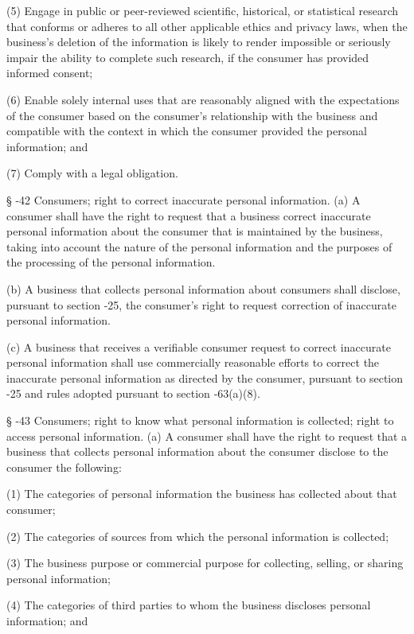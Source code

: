      (5)  Engage in public or peer-reviewed scientific, historical, or statistical research that conforms or adheres to all other applicable ethics and privacy laws, when the business's deletion of the information is likely to render impossible or seriously impair the ability to complete such research, if the consumer has provided informed consent;

     (6)  Enable solely internal uses that are reasonably aligned with the expectations of the consumer based on the consumer's relationship with the business and compatible with the context in which the consumer provided the personal information; and

     (7)  Comply with a legal obligation.

     §   -42  Consumers; right to correct inaccurate personal information.  (a)  A consumer shall have the right to request that a business correct inaccurate personal information about the consumer that is maintained by the business, taking into account the nature of the personal information and the purposes of the processing of the personal information.

     (b)  A business that collects personal information about consumers shall disclose, pursuant to section    -25, the consumer's right to request correction of inaccurate personal information.

     (c)  A business that receives a verifiable consumer request to correct inaccurate personal information shall use commercially reasonable efforts to correct the inaccurate personal information as directed by the consumer, pursuant to section    -25 and rules adopted pursuant to section    ‑63(a)(8).

     §   -43  Consumers; right to know what personal information is collected; right to access personal information.  (a)  A consumer shall have the right to request that a business that collects personal information about the consumer disclose to the consumer the following:

     (1)  The categories of personal information the business has collected about that consumer;

     (2)  The categories of sources from which the personal information is collected;

     (3)  The business purpose or commercial purpose for collecting, selling, or sharing personal information;

     (4)  The categories of third parties to whom the business discloses personal information; and

